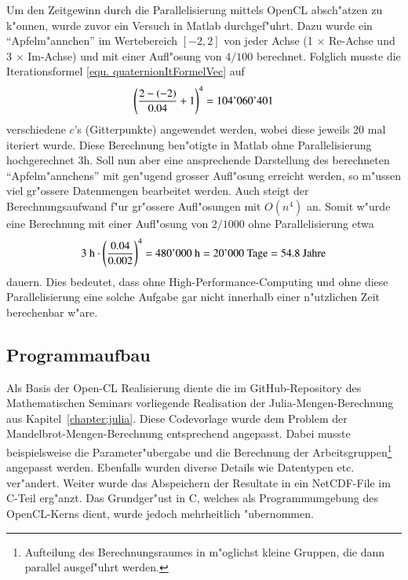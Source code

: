 \begin{refsection}
Um den Zeitgewinn durch die Parallelisierung mittels OpenCL absch"atzen
zu k"onnen, wurde zuvor ein Versuch in Matlab durchgef"uhrt. Dazu
wurde ein ``Apfelm"annchen'' im Wertebereich $[-2, 2]$ von jeder
Achse (1 $\times$ Re-Achse und 3 $\times$ Im-Achse) und mit einer
Aufl"osung von $4/100$ berechnet. Folglich musste die Iterationsformel
\ref{equ. quaternionItFormelVec} auf
\begin{equation}
	\left(\frac{2-(-2)}{0.04}+1\right)^4 = 104\text{\strut'}060\text{\strut'}401
	\label{equ. anzItt}
\end{equation}
verschiedene $c$'s (Gitterpunkte) angewendet werden, wobei diese
jeweils 20 mal iteriert wurde. Diese Berechnung ben"otigte in Matlab
ohne Parallelisierung hochgerechnet 3h. Soll nun aber eine ansprechende
Darstellung des berechneten ``Apfelm"annchens'' mit gen"ugend grosser
Aufl"osung erreicht werden, so m"ussen viel gr"ossere Datenmengen
bearbeitet werden. Auch steigt der Berechnungsaufwand f"ur gr"ossere
Aufl"osungen mit $O(n^4)$ an. Somit w"urde eine Berechnung mit einer
Aufl"osung von $2/1000$ ohne Parallelisierung etwa
\begin{equation}
3 \text{ h} \cdot \left(\frac{0.04}{0.002}\right)^4 = 480\text{\strut'}000 \text{ h} = 20\text{\strut'}000 \text{ Tage} = 54.8 \text{ Jahre}
	\label{equ. timeOhneParallel}
\end{equation}
dauern. Dies bedeutet, dass ohne High-Performance-Computing und ohne
diese Parallelisierung eine solche Aufgabe gar nicht innerhalb einer
n"utzlichen Zeit berechenbar w"are.

\subsection{Programmaufbau}
Als Basis der Open-CL Realisierung diente die im GitHub-Repository
des Mathematischen Seminars vorliegende Realisation der
Julia-Mengen-Berechnung aus Kapitel~\ref{chapter:julia}. Diese Codevorlage
wurde dem Problem der Mandelbrot-Mengen-Berechnung entsprechend
angepasst. Dabei musste beispielsweise die Parameter"ubergabe und die
Berechnung der Arbeitsgruppen\footnote{Aufteilung des Berechnungsraumes
in m"oglichst kleine Gruppen, die dann parallel ausgef"uhrt werden.}
angepasst werden. Ebenfalls wurden diverse Details wie Datentypen
etc. ver"andert. Weiter wurde das Abspeichern der Resultate in ein
NetCDF-File im C-Teil erg"anzt. Das Grundger"ust in C, welches als
Programmumgebung des OpenCL-Kerns dient, wurde jedoch mehrheitlich
"ubernommen.


\end{refsection}
